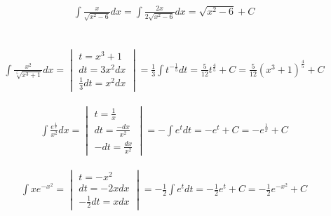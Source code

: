 
\begin{gather*}
  \int \frac{x}{\sqrt{x^2-6}}dx
  = \int \frac{2x}{2\sqrt{x^2-6}}dx
  = \sqrt{x^2-6}+C
\end{gather*}


\begin{gather*}
\end{gather*}


\begin{gather*}
  \int \frac{x^2}{\sqrt[5]{x^3+1}}dx =
  \begin{vmatrix}
    t=x^3+1 \\
    dt=3x^2dx \\
    \frac{1}{3}dt=x^2dx
  \end{vmatrix}
  = \frac{1}{3}\int t^{-\frac{1}{5}}dt
  = \frac{5}{12}t^{\frac{4}{5}}+C
  = \frac{5}{12}(x^3+1)^{\frac{4}{5}}+C
\end{gather*}


\begin{gather*}
  \int \frac{e^{\frac{1}{x}}}{x^2}dx =
  \begin{vmatrix}
    t = \frac{1}{x} \\
    dt = \frac{-dx}{x^2} \\
    -dt = \frac{dx}{x^2}
  \end{vmatrix}
  = -\int e^t dt
  = -e^t+C
  = -e^{\frac{1}{x}}+C
\end{gather*}


\begin{gather*}
  \int xe^{-x^2} =
  \begin{vmatrix}
    t=-x^2 \\
    dt=-2xdx \\
    -\frac{1}{2}dt=xdx
  \end{vmatrix}
  = -\frac{1}{2}\int e^tdt
  = -\frac{1}{2}e^t+C
  = -\frac{1}{2}e^{-x^2}+C
\end{gather*}

